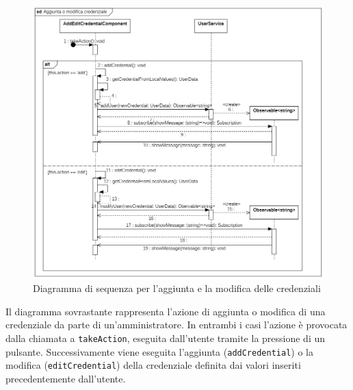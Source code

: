 \begin{figure}[H]
	\centering
	\includegraphics[width=18cm]{res/images/webapp-credenzialiAddEdit-diagrammaSequenza.png}
	\caption{Diagramma di sequenza per l'aggiunta e la modifica delle credenziali}
	\label{fig:DiagrammaSequenzaVisualizzazioneCredenziali}
\end{figure}
Il diagramma sovrastante rappresenta l'azione di aggiunta o modifica di una credenziale da parte di un'amministratore. In entrambi i casi l'azione è provocata dalla chiamata a \texttt{takeAction}, eseguita dall'utente tramite la pressione di un pulsante. Successivamente viene eseguita l'aggiunta (\texttt{addCredential}) o la modifica (\texttt{editCredential}) della credenziale definita dai valori inseriti precedentemente dall'utente.



